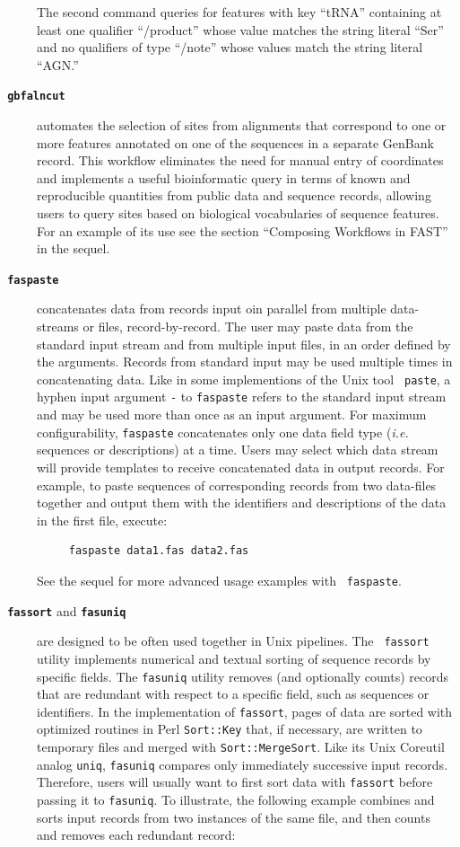 \documentclass{frontiersSCNS} %
\begin{document}
\begin{description}
\noindent The second command queries for features with key ``tRNA'' containing
at least one qualifier ``/product'' whose value matches the string literal
``Ser'' and no qualifiers of type ``/note'' whose values match the
string literal ``AGN.''
\\
\item[\texttt{\textbf{  gbfalncut}} ] automates the selection of sites from
alignments that correspond to one or more features annotated on one of
the sequences in a separate GenBank record. This workflow eliminates
the need for manual entry of coordinates and implements a useful
bioinformatic query in terms of known and reproducible quantities from
public data and sequence records, allowing users to query sites based
on biological vocabularies of sequence features. For an example of its
use see the section ``Composing Workflows in FAST'' in the sequel.
\\
\item[\texttt{\textbf{ faspaste}} ] concatenates data from records
  input oin parallel from multiple data-streams or files,
  record-by-record. The user may paste data from the standard input
  stream and from multiple input files, in an order defined by the
  arguments. Records from standard input may be used multiple times in
  concatenating data. Like in some implementions of the Unix tool {\tt
    paste}, a hyphen input argument {\tt -} to {\tt faspaste} refers
  to the standard input stream and may be used more than once as an
  input argument. For maximum configurability, {\tt faspaste}
  concatenates only one data field type ({\it i.e.} sequences or
  descriptions) at a time. Users may select which data stream will
  provide templates to receive concatenated data in output
  records. For example, to paste sequences of corresponding records
  from two data-files together and output them with the identifiers
  and descriptions of the data in the first file, execute:

\begin{verbatim}
     faspaste data1.fas data2.fas
\end{verbatim}
  \noindent See the sequel for more advanced usage examples with {\tt
    faspaste}.
  \\
\item[\texttt{\textbf{ fassort}} and \texttt{\textbf{fasuniq}} ] are
  designed to be often used together in Unix pipelines. The {\tt
    fassort} utility implements numerical and textual sorting of
  sequence records by specific fields. The {\tt fasuniq} utility
  removes (and optionally counts) records that are redundant with
  respect to a specific field, such as sequences or identifiers. In
  the implementation of {\tt fassort}, pages of data are sorted with
  optimized routines in Perl {\tt Sort::Key} that, if necessary, are
  written to temporary files and merged with {\tt Sort::MergeSort}.
  Like its Unix Coreutil analog {\tt uniq}, {\tt fasuniq} compares
  only immediately successive input records. Therefore, users will
  usually want to first sort data with {\tt fassort} before passing it
  to {\tt fasuniq}. To illustrate, the following example combines and
  sorts input records from two instances of the same file, and then
  counts and removes each redundant record:


\end{description}
\end{document}
